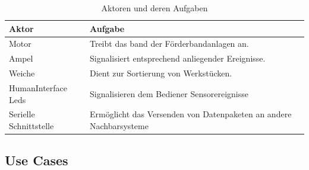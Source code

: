 \documentclass[a4paper, 11pt]{article}
\begin{document}
\begin{table}[H]
\center
    \begin{tabularx}{\textwidth}{|l|X|}
    \hline
    \textbf{Aktor}&\textbf{Aufgabe}\\
    \hline
    Motor&Treibt das band der Förderbandanlagen an.\\
    \hline
    Ampel&Signalisiert entsprechend anliegender Ereignisse.\\
    \hline
    Weiche&Dient zur Sortierung von Werkstücken.\\
    \hline
    HumanInterface Leds&Signalisieren dem Bediener Sensorereignisse\\
    \hline
    Serielle Schnittstelle&Ermöglicht das Versenden von Datenpaketen an andere Nachbarsysteme\\
    \hline
    \end{tabularx}
    \caption{Aktoren und deren Aufgaben}
    \label{acttasks}
\end{table}

\newpage

\subsection{Use Cases}
\end{document}
